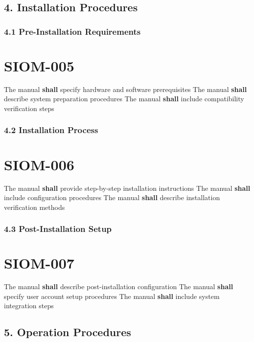 \subsection{4. Installation Procedures}

\subsubsection{4.1 Pre-Installation Requirements}

\section{SIOM-005}\label{SIOM-005}

The manual \textbf{shall} specify hardware and software prerequisites
The manual \textbf{shall} describe system preparation procedures
The manual \textbf{shall} include compatibility verification steps

\subsubsection{4.2 Installation Process}

\section{SIOM-006}\label{SIOM-006}

The manual \textbf{shall} provide step-by-step installation instructions
The manual \textbf{shall} include configuration procedures
The manual \textbf{shall} describe installation verification methods

\subsubsection{4.3 Post-Installation Setup}

\section{SIOM-007}\label{SIOM-007}

The manual \textbf{shall} describe post-installation configuration
The manual \textbf{shall} specify user account setup procedures
The manual \textbf{shall} include system integration steps

\subsection{5. Operation Procedures}

